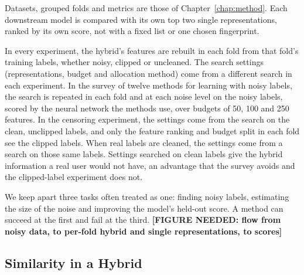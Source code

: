 
Datasets, grouped folds and metrics are those of Chapter~\ref{chap:method}. Each downstream model is compared with its own top two single representations, ranked by its own score, not with a fixed list or one chosen fingerprint.

In every experiment, the hybrid's features are rebuilt in each fold from that fold's training labels, whether noisy, clipped or uncleaned. The search settings (representations, budget and allocation method) come from a different search in each experiment. In the survey of twelve methods for learning with noisy labels, the search is repeated in each fold and at each noise level on the noisy labels, scored by the neural network the methods use, over budgets of 50, 100 and 250 features. In the censoring experiment, the settings come from the search on the clean, unclipped labels, and only the feature ranking and budget split in each fold see the clipped labels. When real labels are cleaned, the settings come from a search on those same labels. Settings searched on clean labels give the hybrid information a real user would not have, an advantage that the survey avoids and the clipped-label experiment does not.

We keep apart three tasks often treated as one: finding noisy labels, estimating the size of the noise and improving the model's held-out score. A method can succeed at the first and fail at the third. \textbf{[FIGURE NEEDED: flow from noisy data, to per-fold hybrid and single representations, to scores]}



\subsection{Similarity in a Hybrid}\label{sec:similarity:hybrid_similarity}

